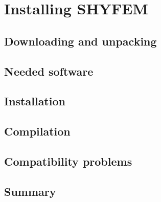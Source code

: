 \documentclass{report}
\newcommand{\todo}[1]{This section still has to be written by #1}
\begin{document}




\chapter{Installing SHYFEM}

	\section{Downloading and unpacking}
	

	\section{Needed software}
	

	\section{Installation}
	

	\section{Compilation}
	

	\section{Compatibility problems}
	

	\section{Summary}
	
\end{document}
